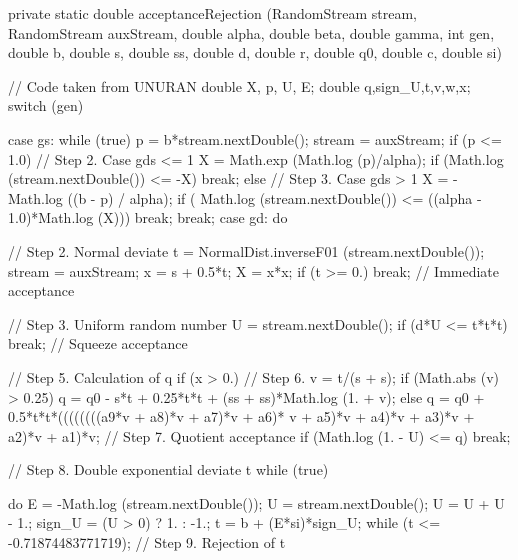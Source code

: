 \begin{code}\begin{hide}

   private static double acceptanceRejection
      (RandomStream stream, RandomStream auxStream,
       double alpha, double beta, double gamma, int gen,
       double b, double s, double ss,
       double d, double r, double q0, double c, double si) {
      // Code taken from UNURAN
      double X, p, U, E;
      double q,sign_U,t,v,w,x;
      switch (gen) {
      case gs:
         while (true) {
            p = b*stream.nextDouble();
            stream = auxStream;
            if (p <= 1.0) {                   // Step 2. Case gds <= 1
               X = Math.exp (Math.log (p)/alpha);
               if (Math.log (stream.nextDouble()) <= -X)
                  break;
            }
            else {                           // Step 3. Case gds > 1
               X = -Math.log ((b - p) / alpha);
               if ( Math.log (stream.nextDouble()) <= ((alpha - 1.0)*Math.log (X)))
                  break;
            }
         }
         break;
      case gd:
        do {

            // Step 2. Normal deviate
            t = NormalDist.inverseF01 (stream.nextDouble());
            stream = auxStream;
            x = s + 0.5*t;
            X = x*x;
            if (t >= 0.)
               break;         // Immediate acceptance

            // Step 3. Uniform random number
            U = stream.nextDouble();
            if (d*U <= t*t*t) 
               break;         // Squeeze acceptance

            // Step 5. Calculation of q
            if (x > 0.) {
               // Step 6.
               v = t/(s + s);
               if (Math.abs (v) > 0.25)
                  q = q0 - s*t + 0.25*t*t + (ss + ss)*Math.log (1. + v);
               else
                  q = q0 + 0.5*t*t*((((((((a9*v + a8)*v + a7)*v + a6)*
                                     v + a5)*v + a4)*v + a3)*v + a2)*v + a1)*v;
               // Step 7. Quotient acceptance
               if (Math.log (1. - U) <= q)
                  break;
            }

            // Step 8. Double exponential deviate t
            while (true) {
               do {
                  E = -Math.log (stream.nextDouble());
                  U = stream.nextDouble();
                  U = U + U - 1.;
                  sign_U = (U > 0) ? 1. : -1.;
                  t = b + (E*si)*sign_U;
               } while (t <= -0.71874483771719);   // Step 9. Rejection of t

}}}}
\end{hide}
\end{code}
